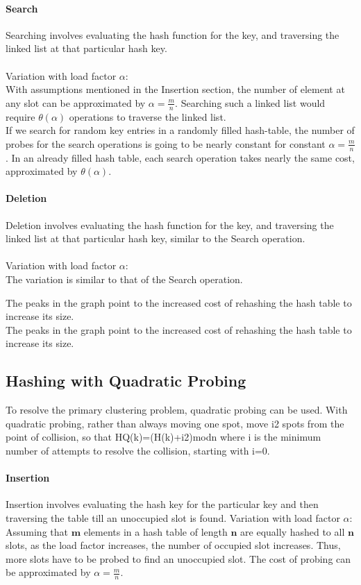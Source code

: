 \documentclass[12pt]{article}
\begin{document}
\paragraph{Search}
Searching involves evaluating the hash function for the key, and traversing the linked list at that particular hash key.\\ \\
Variation with load factor $\alpha$:\\
With assumptions mentioned in the Insertion section, the number of element at any slot can be approximated by $\alpha=\frac{m}{n}$. Searching such a linked list would require $\theta(\alpha)$ operations to traverse the linked list.\\
If we search for random key entries in a randomly filled hash-table, the number of probes for the search operations is going to be nearly constant for constant $\alpha=\frac{m}{n}$. In an already filled hash table, each search operation takes nearly the same cost, approximated by $\theta(\alpha)$.

\paragraph{Deletion}
Deletion involves evaluating the hash function for the key, and traversing the linked list at that particular hash key, similar to the Search operation.\\ \\
Variation with load factor $\alpha$:\\
The variation is similar to that of the Search operation.

The peaks in the graph point to the increased cost of rehashing the hash table to increase its size.\\

The peaks in the graph point to the increased cost of rehashing the hash table to increase its size.\\

\subsection{Hashing with Quadratic Probing}\label{Hashing with Quadratic Probing}
To resolve the primary clustering problem, quadratic probing can be used. With quadratic probing, rather than always moving one spot, move i2 spots from the point of collision, so that HQ(k)=(H(k)+i2)modn where i is the minimum number of attempts to resolve the collision, starting with i=0.
\paragraph{Insertion}
Insertion involves evaluating the hash key for the particular key and then traversing the table till an unoccupied slot is found.
Variation with load factor $\alpha$:\\
Assuming that $\mathbf{m}$ elements in a hash table of length $\mathbf{n}$ are equally hashed to all $\mathbf{n}$ slots, as the load factor increases, the number of occupied slot increases. Thus, more slots have to be probed to find an unoccupied slot. The cost of probing can be approximated by $\alpha=\frac{m}{n}$. 
\end{document}
